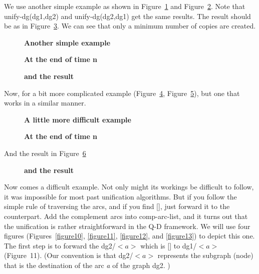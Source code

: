 We use  another simple example as shown in Figure~\ref{figure4}
and Figure~\ref{figure5}. Note that unify-dg(dg1,dg2) and unify-dg(dg2,dg1) get
the same results.  The result should be as in Figure~\ref{figure6}.  We can see
that only a minimum number of copies are created.

\begin{figure}[htb]
\vspace*{-38mm}
\hspace{-1cm}
\caption{{\bf Another simple example}}
\label{figure4}
\end{figure}
\clearpage

\begin{figure}[htb]
\caption{{\bf At the end of time n}}
\label{figure5}
\end{figure}

\begin{figure}[htb]
\caption{{\bf and the result}}
\label{figure6}
\end{figure}

\clearpage

Now, for a bit more complicated example (Figure~\ref{figure7}, Figure~\ref{figure8}), but
one that works in a similar manner.

\begin{figure}[htb]
\vspace*{-40mm}
\hspace{-1cm}
\caption{{\bf A little more difficult example}}
\label{figure7}
\end{figure}

\begin{figure}[hbt]
\vspace*{-35mm}
\hspace*{-1cm}
\caption{{\bf At the end of time n}}
\label{figure8}
\end{figure}
And the result in Figure~\ref{figure9}
\begin{figure}[htb]
\vspace{-20mm}
\caption{{\bf and the result}}
\label{figure9}
\end{figure}
\clearpage

Now comes a difficult example. Not only might its workings be
difficult to follow, it was impossible for most past unification
algorithms. But if you follow the simple rule of traversing the arcs,
and if you find [], just forward it to the counterpart. Add the
complement arcs into comp-arc-list, and it turns out that the
unification is rather straightforward in the Q-D framework. We will
use four figures (Figures~\ref{figure10}, \ref{figure11}, \ref{figure12}, and \ref{figure13}) to depict this one. The
first step is to forward the dg2/$<a>$ which is [] to dg1/$<a>$
(Figure~11). (Our convention is that dg2/$<a>$ represents the subgraph
(node) that is the destination of the arc {\it a} of the graph dg2. )

